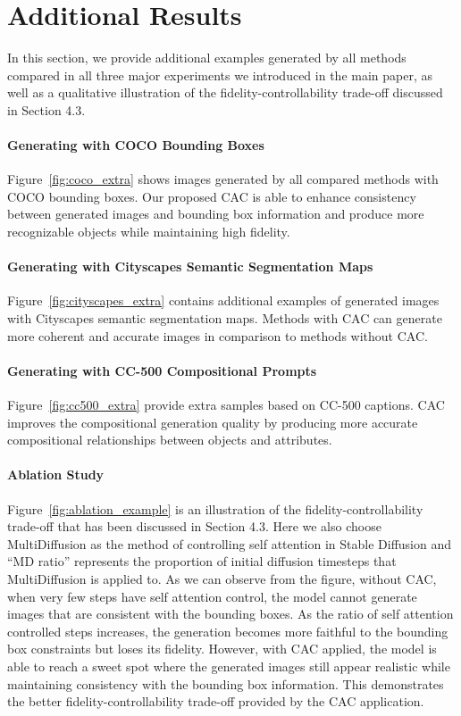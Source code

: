 \section{Additional Results}

In this section, we provide additional examples generated by all methods compared in all three major experiments we introduced in the main paper, as well as a qualitative illustration of the fidelity-controllability trade-off discussed in Section 4.3.

\paragraph{Generating with COCO Bounding Boxes}
Figure~\ref{fig:coco_extra} shows images generated by all compared methods with COCO bounding boxes. Our proposed CAC is able to enhance consistency between generated images and bounding box information and produce more recognizable objects while maintaining high fidelity.

\paragraph{Generating with Cityscapes Semantic Segmentation Maps}
Figure~\ref{fig:cityscapes_extra} contains additional examples of generated images with Cityscapes semantic segmentation maps. Methods with CAC can generate more coherent and accurate images in comparison to methods without CAC.
\paragraph{Generating with CC-500 Compositional Prompts} 
Figure~\ref{fig:cc500_extra} provide extra samples based on CC-500 captions. CAC improves the compositional generation quality by producing more accurate compositional relationships between objects and attributes.

\paragraph{Ablation Study}
Figure~\ref{fig:ablation_example} is an illustration of the fidelity-controllability trade-off that has been discussed in Section 4.3. Here we also choose MultiDiffusion as the method of controlling self attention in Stable Diffusion and ``MD ratio'' represents the proportion of initial diffusion timesteps that MultiDiffusion is applied to. As we can observe from the figure, without CAC, when very few steps have self attention control, the model cannot generate images that are consistent with the bounding boxes. As the ratio of self attention controlled steps increases, the generation becomes more faithful to the bounding box constraints but loses its fidelity. However, with CAC applied, the model is able to reach a sweet spot where the generated images still appear realistic while maintaining consistency with the bounding box information. This demonstrates the better fidelity-controllability trade-off provided by the CAC application.

